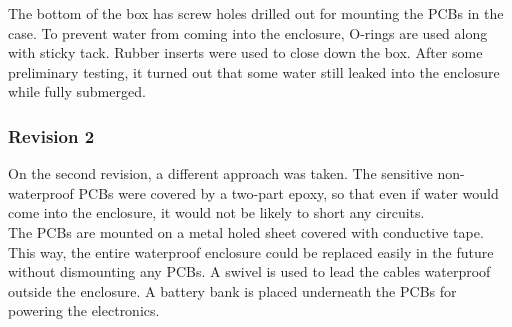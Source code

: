 The bottom of the box has screw holes drilled out for mounting the \gls{PCB}s in the case. To prevent water from coming into the enclosure, O-rings are used along with sticky tack. Rubber inserts were used to close down the box. After some preliminary testing, it turned out that some water still leaked into the enclosure while fully submerged.
\newpage
\subsubsection{Revision 2}
On the second revision, a different approach was taken. The sensitive non-waterproof \gls{PCB}s were covered by a two-part epoxy, so that even if water would come into the enclosure, it would not be likely to short any circuits.\\

The \gls{PCB}s are mounted on a metal holed sheet covered with conductive tape. This way, the entire waterproof enclosure could be replaced easily in the future without dismounting any \gls{PCB}s. A swivel is used to lead the cables waterproof outside the enclosure. A battery bank is placed underneath the \gls{PCB}s for powering the electronics.

